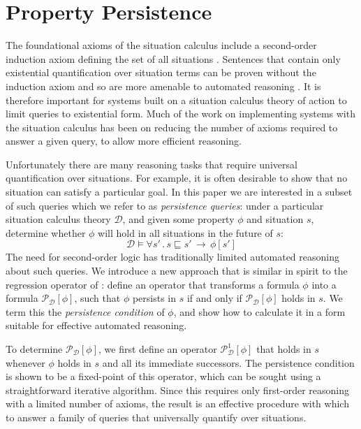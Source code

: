 


\chapter{Property Persistence}

\label{ch:persistence}

The foundational axioms of the situation calculus include a second-order
induction axiom defining the set of all situations \citep{Reiter93proving}.
Sentences that contain only existential quantification over situation
terms can be proven without the induction axiom and so are more amenable
to automated reasoning \citep{pirri99contributions_sitcalc}. It is
therefore important for systems built on a situation calculus theory
of action to limit queries to existential form. Much of the work on
implementing systems with the situation calculus has been on reducing
the number of axioms required to answer a given query, to allow more
efficient reasoning.

Unfortunately there are many reasoning tasks that require universal
quantification over situations. For example, it is often desirable
to show that no situation can satisfy a particular goal. In this paper
we are interested in a subset of such queries which we refer to as
\emph{persistence queries}: under a particular situation calculus
theory $\mathcal{D}$, and given some property $\phi$ and situation
$s$, determine whether $\phi$ will hold in all situations in the
future of $s$:\[
\mathcal{D}\models\forall s'\,.\, s\sqsubseteq s'\,\rightarrow\,\phi[s']\]
 The need for second-order logic has traditionally limited automated
reasoning about such queries. We introduce a new approach that is
similar in spirit to the regression operator of \citep{reiter91frameprob}:
define an operator that transforms a formula $\phi$ into a formula
$\mathcal{P}_{\mathcal{D}}[\phi]$, such that $\phi$ persists in
$s$ if and only if $\mathcal{P}_{\mathcal{D}}[\phi]$ holds in $s$.
We term this the \emph{persistence condition} of $\phi$, and show
how to calculate it in a form suitable for effective automated reasoning.

To determine $\mathcal{P}_{\mathcal{D}}[\phi]$, we first define an
operator $\mathcal{P}_{\mathcal{D}}^{1}[\phi]$ that holds in $s$
whenever $\phi$ holds in $s$ and all its immediate successors. The
persistence condition is shown to be a fixed-point of this operator,
which can be sought using a straightforward iterative algorithm. Since
this requires only first-order reasoning with a limited number of
axioms, the result is an effective procedure with which to answer
a family of queries that universally quantify over situations.


